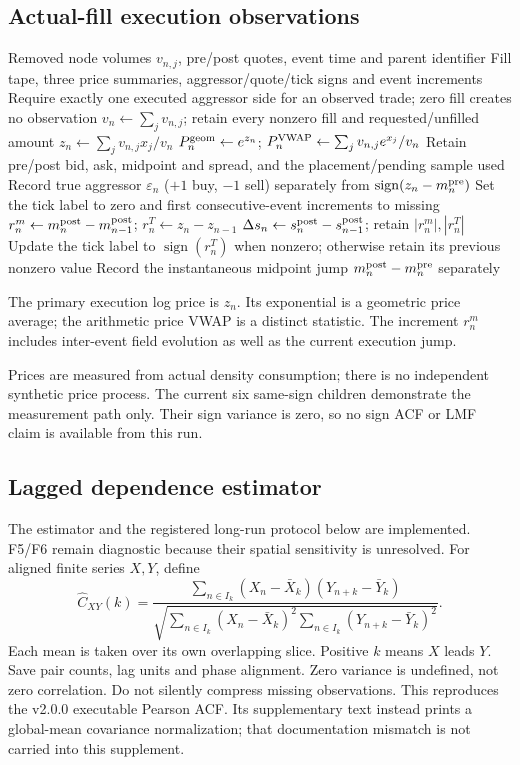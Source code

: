 \documentclass[11pt,a4paper]{article}
\begin{document}
\clearpage
\subsection{Actual-fill execution observations}
\begin{algorithm}[H]
\caption{Actual-fill execution prices, labels and consecutive-event increments}\label{alg:tape}
\begin{algorithmic}[1]
\Require Removed node volumes $v_{n,j}$, pre/post quotes, event time and parent identifier
\Ensure Fill tape, three price summaries, aggressor/quote/tick signs and event increments
\State Require exactly one executed aggressor side for an observed trade; zero fill creates no observation
\State $v_n\gets\sum_jv_{n,j}$; retain every nonzero fill and requested/unfilled amount
\State $z_n\gets\sum_jv_{n,j}x_j/v_n$
\State $P_n^{\rm geom}\gets e^{z_n}$; $P_n^{\rm VWAP}\gets\sum_jv_{n,j}e^{x_j}/v_n$
\State Retain pre/post bid, ask, midpoint and spread, and the placement/pending sample used
\State Record true aggressor $\varepsilon_n$ ($+1$ buy, $-1$ sell) separately from $\operatorname{sign}(z_n-m_n^{\rm pre})$
\State Set the tick label to zero and first consecutive-event increments to missing
\Else
\State $r_n^m\gets m_n^{\rm post}-m_{n-1}^{\rm post}$; $r_n^T\gets z_n-z_{n-1}$
\State $\Delta s_n\gets s_n^{\rm post}-s_{n-1}^{\rm post}$; retain $|r_n^m|,|r_n^T|$
\State Update the tick label to $\operatorname{sign}(r_n^T)$ when nonzero; otherwise retain its previous nonzero value
\EndIf
\State Record the instantaneous midpoint jump $m_n^{\rm post}-m_n^{\rm pre}$ separately
\end{algorithmic}
\end{algorithm}
The primary execution log price is $z_n$. Its exponential is a geometric price average; the arithmetic price VWAP is a distinct statistic. The increment $r_n^m$ includes inter-event field evolution as well as the current execution jump.

Prices are measured from actual density consumption; there is no independent
synthetic price process. The current six same-sign children demonstrate the
measurement path only. Their sign variance is zero, so no sign ACF or LMF
claim is available from this run.

\subsection{Lagged dependence estimator}
The estimator and the registered long-run protocol below are implemented.
F5/F6 remain diagnostic because their spatial sensitivity is unresolved. For aligned finite series $X,Y$, define
\[
 \widehat C_{XY}(k)=
 \frac{\sum_{n\in I_k}(X_n-\bar X_k)(Y_{n+k}-\bar Y_k)}
 {\sqrt{\sum_{n\in I_k}(X_n-\bar X_k)^2
              \sum_{n\in I_k}(Y_{n+k}-\bar Y_k)^2}}.
\]
Each mean is taken over its own overlapping slice. Positive $k$ means $X$
leads $Y$. Save pair counts, lag units and phase alignment. Zero variance is
undefined, not zero correlation. Do not silently compress missing observations.
This reproduces the v2.0.0 executable Pearson ACF. Its supplementary text
instead prints a global-mean covariance normalization; that documentation
mismatch is not carried into this supplement.
\end{document}
